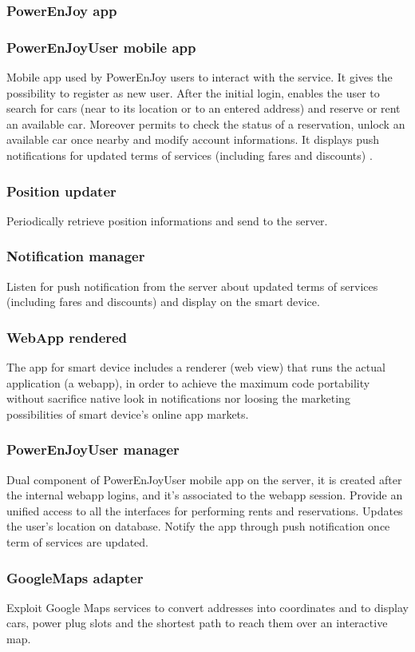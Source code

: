\documentclass[english]{article}
\begin{document}
\subsubsection*{PowerEnJoy app}
	
	\subsubsection{PowerEnJoyUser mobile app}
	Mobile app used by PowerEnJoy users to interact with the service. It gives the possibility to register as new user. After the initial login, enables the user to search for cars (near to its location or to an entered address) and reserve or rent an available car. Moreover permits to check the status of a reservation, unlock an available car once nearby and modify account informations. It displays push notifications for updated terms of services (including fares and discounts) .
		\subsubsection{Position updater}
		Periodically retrieve position informations and send to the server.
		\subsubsection{Notification manager}
		Listen for push notification from the server about updated terms of services (including fares and discounts) and display on the smart device.
		\subsubsection{WebApp rendered}
		The app for smart device includes a renderer (web view) that runs the actual application (a webapp), in order to achieve the maximum code portability without sacrifice native look in notifications nor loosing the marketing possibilities of smart device's online app markets.
	\subsubsection{PowerEnJoyUser manager}
	Dual component of PowerEnJoyUser mobile app on the server, it is created after the internal webapp logins, and it's associated to the webapp session. Provide an unified access to all the interfaces for performing rents and reservations. Updates the user's location on database. Notify the app through push notification once term of services are updated.
	\subsubsection{GoogleMaps adapter}
	Exploit Google Maps services to convert addresses into coordinates and to display cars, power plug slots and the shortest path to reach them over an interactive map.
\end{document}
